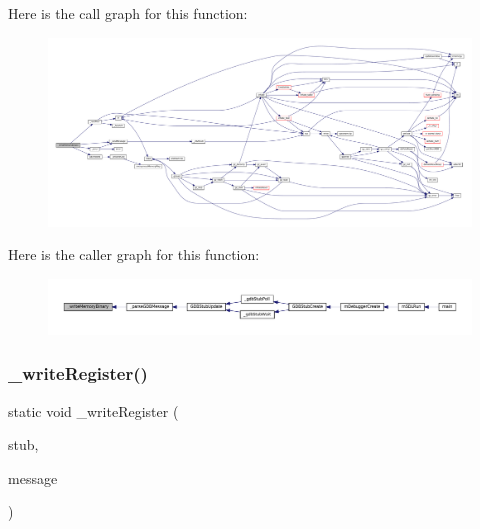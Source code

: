 Here is the call graph for this function\+:
\nopagebreak
\begin{figure}[H]
\begin{center}
\leavevmode
\includegraphics[width=350pt]{gdb-stub_8c_a57b8f62dd442a177c1cca999ec2010a4_cgraph}
\end{center}
\end{figure}
Here is the caller graph for this function\+:
\nopagebreak
\begin{figure}[H]
\begin{center}
\leavevmode
\includegraphics[width=350pt]{gdb-stub_8c_a57b8f62dd442a177c1cca999ec2010a4_icgraph}
\end{center}
\end{figure}
\mbox{\label{gdb-stub_8c_aa8d43b0007b4cac1d3dcad6212b8406e}} 
\subsubsection{\texorpdfstring{\+\_\+write\+Register()}{\_writeRegister()}}
{\footnotesize\ttfamily static void \+\_\+write\+Register (\begin{DoxyParamCaption}\item[{struct G\+D\+B\+Stub $\ast$}]{stub,  }\item[{const char $\ast$}]{message }\end{DoxyParamCaption})\hspace{0.3cm}{\ttfamily [static]}}

